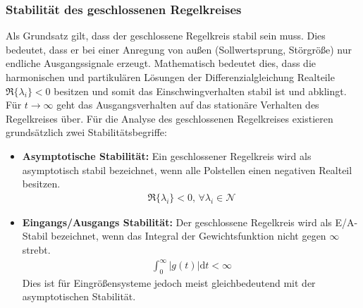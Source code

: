 \subsubsection{Stabilität des geschlossenen Regelkreises}
%
Als Grundsatz gilt, dass der geschlossene Regelkreis stabil sein muss. Dies bedeutet, dass er bei einer Anregung von außen (Sollwertsprung, Störgröße) nur endliche Ausgangssignale erzeugt. Mathematisch bedeutet dies, dass die harmonischen und partikulären Lösungen der Differenzialgleichung Realteile $\Re\{\lambda_{i}\} < 0$ besitzen und somit das Einschwingverhalten stabil ist und abklingt. Für $t\rightarrow \infty$ geht das Ausgangsverhalten auf das stationäre Verhalten des Regelkreises über. Für die Analyse des geschlossenen Regelkreises existieren grundsätzlich zwei Stabilitätsbegriffe:
%
\begin{itemize}
	\item \textbf{Asymptotische Stabilität:} Ein geschlossener Regelkreis wird als asymptotisch stabil bezeichnet, wenn alle Polstellen einen negativen Realteil besitzen.
	\begin{equation}
	\begin{aligned}
	\Re\{\lambda_{i}\}< 0,\,\forall \lambda_{i} \in \mathcal{N}
	\end{aligned}
	\end{equation}
	\item\textbf{Eingangs/Ausgangs Stabilität:} Der geschlossene Regelkreis wird als E/A-Stabil bezeichnet, wenn das Integral der Gewichtsfunktion nicht gegen $\infty$ strebt. 
	\begin{equation}
	\begin{aligned}
	\int_{0}^{\infty}{\left|g(t)\right|}\text{d}t<\infty
	\end{aligned}
	\end{equation}
	Dies ist für Eingrößensysteme jedoch meist gleichbedeutend mit der asymptotischen Stabilität.
\end{itemize}
%
